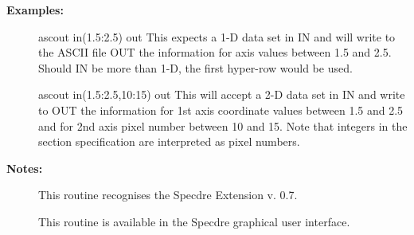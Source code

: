 \begin{description}
\item [\textbf{Examples:}]
\begin{terminalv}
ascout in(1.5:2.5) out
   This expects a 1-D data set in IN and will write to the ASCII
   file OUT the information for axis values between 1.5 and 2.5.
   Should IN be more than 1-D, the first hyper-row would be used.

ascout in(1.5:2.5,10:15) out
   This will accept a 2-D data set in IN and write to OUT the
   information for 1st axis coordinate values between 1.5 and 2.5
   and for 2nd axis pixel number between 10 and 15. Note that
   integers in the section specification are interpreted as pixel
   numbers.
\end{terminalv}

\item [\textbf{Notes:}]
This routine recognises the Specdre Extension v. 0.7.

This routine is available in the Specdre graphical user interface.
\end{description}
